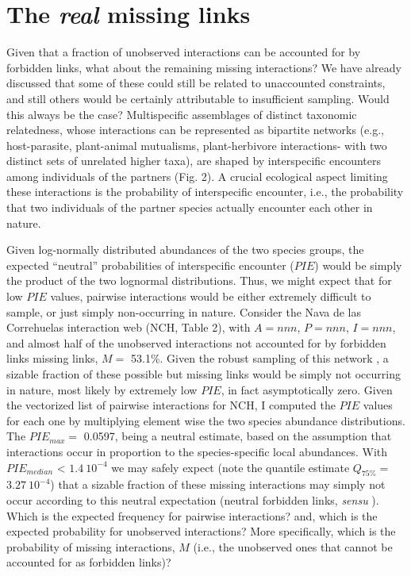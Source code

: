 \documentclass[12pt]{article}
\begin{document}
\section*{The \emph{real} missing links}
\label{therealmissinglinks}

Given that a fraction of unobserved interactions can be accounted for by forbidden links, what about the remaining missing interactions? We have already discussed that some of these could still be related to unaccounted constraints, and still others would be certainly attributable to insufficient sampling. Would this always be the case? Multispecific assemblages of distinct taxonomic relatedness, whose interactions can be represented as bipartite networks (e.g., host-parasite, plant-animal mutualisms, plant-herbivore interactions- with two distinct sets of unrelated higher taxa), are shaped by interspecific encounters among individuals of the partners (Fig. 2). A crucial ecological aspect limiting these interactions is the probability of interspecific encounter, i.e., the probability that two individuals of the partner species actually encounter each other in nature. 

Given log-normally distributed abundances of the two species groups, the expected ``neutral'' probabilities of interspecific encounter ($PIE$) would be simply the product of the two lognormal distributions. Thus, we might expect that for low $PIE$ values, pairwise interactions would be either extremely difficult to sample, or just simply non-occurring in nature. Consider the Nava de las Correhuelas interaction web (NCH, Table 2), with $A= nnn$, $P= nnn$, $I= nnn$, and almost half of the unobserved interactions not accounted for by forbidden links missing links, $M=$ 53.1\%. Given the robust sampling of this network \citep{Jordano:2009c}, a sizable fraction of these possible but missing links would be simply not occurring in nature, most likely by extremely low $PIE$, in fact asymptotically zero. Given the vectorized list of pairwise interactions for NCH, I computed the $PIE$ values for each one by multiplying element wise the two species abundance distributions. The ${PIE}_{max}=$ 0.0597, being a neutral estimate, based on the assumption that interactions occur in proportion to the species-specific local abundances. With $PIE_{median}$ < $1.4\ 10^{-4}$ we may safely expect (note the quantile estimate $Q_{75\%}= $$3.27\ 10^{-4}$) that a sizable fraction of these missing interactions may simply not occur according to this neutral expectation \citep{E31/2562} \citep{Olesen:2011a} (neutral forbidden links, \emph{sensu} \citep{Canard:2012jy}). Which is the expected frequency for pairwise interactions? and, which is the expected probability for unobserved interactions? More specifically, which is the probability of missing interactions, $M$ (i.e., the unobserved ones that cannot be accounted for as forbidden links)? 
\end{document}
